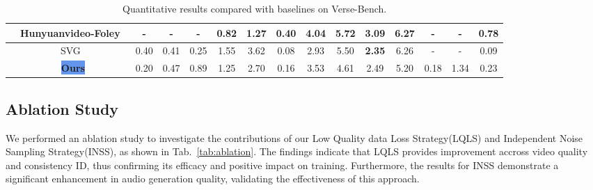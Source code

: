 \begin{table}
{\begin{tabular}{l|c|c|c|c|c|c|c|c|c|c|c|c|c|c}
     & Hunyuanvideo-Foley~\cite{shan2025hunyuanvideo}   & - & - & - & \textbf{0.82} & \textbf{1.27} & \textbf{0.40} & \textbf{4.04} & 5.72 & 3.09 & 6.27 & - & - & 0.78 \\
    \midrule
     & SVG~\cite{ishii2024simple}                       & 0.40 & 0.41 & 0.25 & 1.55 & 3.62 & 0.08 & 2.93 & 5.50 & \textbf{2.35} & 6.26 & - & - & 0.09 \\  
     & \colorbox{CornflowerBlue}{\textbf{Ours}}         & 0.20 & 0.47 & 0.89 & 1.25 & 2.70 & 0.16 & 3.53 & 4.61 & 2.49 & 5.20 & 0.18 & 1.34 & 0.23 \\ 
    \bottomrule
    \end{tabular}
}
\vspace{1em}
\caption{Quantitative results compared with baselines on Verse-Bench.}
\label{tab:uni_bench}
\vspace{-1em}
\end{table}


\subsection{Ablation Study}
We performed an ablation study to investigate the contributions of our Low Quality data Loss Strategy(LQLS) and Independent Noise Sampling Strategy(INSS), as shown in Tab.~\ref{tab:ablation}. The findings indicate that LQLS provides improvement accross video quality and consistency ID, thus confirming its efficacy and positive impact on training. Furthermore, the results for INSS demonstrate a significant enhancement in audio generation quality, validating the effectiveness of this approach.

